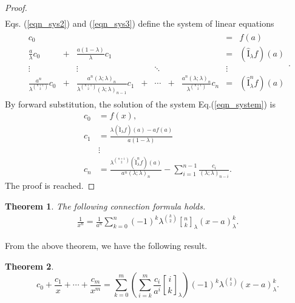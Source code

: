 \documentclass[12pt]{article}
\newcommand{\qbinom}{\genfrac{[}{]}{0pt}{}}
\newcommand{\I}{\widehat{\mathrm{I}}}
\newtheorem{theorem}{Theorem}
\begin{document}
\begin{proof}
\begin{align}
\end{align}
Eqs. (\ref{eqn_sys2}) and (\ref{eqn_sys3}) define the system of linear equations
\begin{align}\label{eqn_system}
\begin{array}{ccccccccc}
    c_{0}& & & & & & &=&f(a)\\
    \frac{a}{\lambda}c_{0}& + &\frac{a(1-\lambda)}{\lambda}c_{1} & & & & & =&(\I_{\lambda}f)(a)\\
    \vdots& & \vdots &  & \ddots & & &\vdots\\
    \frac{a^n}{\lambda^{\binom{n+1}{2}}}c_{0}& + &\frac{a^n(\lambda;\lambda)_{n}}{\lambda^{\binom{n+1}{2}}(\lambda;\lambda)_{n-1}}c_{1} & + & \cdots &  + &\frac{a^n(\lambda;\lambda)_{n}}{\lambda^{\binom{n+1}{2}}}c_{n} &=&(\I_{\lambda}^nf)(a)
\end{array}.
\end{align}
By forward substitution, the solution of the system Eq.(\ref{eqn_system}) is
\begin{align*}
    c_{0}&=f(x),\\
    c_{1}&=\frac{\lambda(\I_{\lambda}f)(a)-af(a)}{a(1-\lambda)}\\
    &\vdots\\
    c_{n}&=\frac{\lambda^{\binom{n+1}{2}}(\I_{\lambda}^{n}f)(a)}{a^n(\lambda;\lambda)_{n}}-\sum_{i=1}^{n-1}\frac{c_{i}}{(\lambda;\lambda)_{n-i}}.
\end{align*}
The proof is reached.
\end{proof}


\begin{theorem}
The following connection formula holds.
    \begin{align*}
        \frac{1}{x^n}=\frac{1}{a^n}\sum_{k=0}^n(-1)^k\lambda^{\binom{k}{2}}\qbinom{n}{k}_{\lambda}(x-a)_{\lambda}^k.
    \end{align*}
\end{theorem}
From the above theorem, we have the following result.
\begin{theorem}
    \begin{equation}\label{eqn_reci_func}
        c_{0}+\frac{c_{1}}{x}+\cdots+\frac{c_{m}}{x^m}=\sum_{k=0}^{m}\left(\sum_{i=k}^{m}\frac{c_{i}}{a^i}\qbinom{i}{k}_{\lambda}\right)(-1)^k\lambda^{\binom{k}{2}}(x-a)_{\lambda}^k.
    \end{equation}
\end{theorem}
\end{document}
